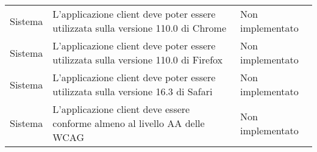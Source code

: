 \begin{center}
\begin{xltabular}{\linewidth}{|l|X|l|}
        Sistema & L'applicazione client deve poter essere utilizzata sulla versione 110.0 di Chrome  & Non implementato\\
        Sistema & L'applicazione client deve poter essere utilizzata sulla versione 110.0 di Firefox  & Non implementato\\
        Sistema & L'applicazione client deve poter essere utilizzata sulla versione 16.3 di Safari  & Non implementato\\
        Sistema & L'applicazione client deve essere conforme almeno al livello AA delle WCAG  & Non implementato\\
    
        
        \hline
    \end{xltabular}
\end{center}